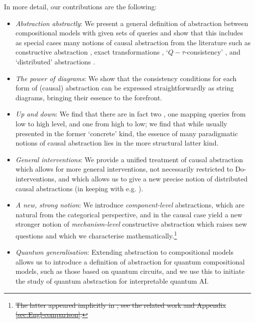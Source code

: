 \documentclass{article}
\begin{document}
\vspace*{0.15cm}
\begin{center}
\end{center}
\vspace*{0.15cm}
In more detail, our contributions are the following: 
\begin{itemize}


	\item \emph{Abstraction abstractly}:  
	We present a general definition of abstraction between compositional models with given sets of queries and show that this includes as special cases many notions of causal abstraction from the literature such as constructive abstraction \cite{BeckersEtAl_2019_AbstractingCausalModles}, exact transformations \cite{rubenstein2017causal}, `$Q-\tau$-consistency' \cite{xia2024neural}, and `distributed' abstractions \cite{geiger2023causal,geiger2024finding}. 

	\item  \emph{The power of diagrams}: We show that the consistency conditions for each form of (causal) abstraction can be expressed straightforwardly as string diagrams, bringing their essence to the forefront.

	\item  \emph{Up and down}: We find that there are in fact two , one mapping queries from low to high level, and one from high to low; we find that while usually presented in the former `concrete' kind, the essence of many paradigmatic notions of causal abstraction lies in the more structural latter kind. 

	\item \emph{General interventions}: We provide a unified treatment of causal abstraction which allows for more general interventions, not necessarily restricted to Do-interventions, and which allows us to give a new precise notion of distributed causal abstractions (in keeping with e.g. \cite{massidda2023causal, geiger2023causal}).

	\item \emph{A new, strong notion}: We introduce \emph{component-level} abstractions, which are natural from the categorical perspective, and in the causal case yield a new stronger notion of \emph{mechanism-level} constructive abstraction which raises new questions and which we characterise mathematically.\footnote{\st{The latter appeared implicitly in \cite{englberger2025causal}; see the related work and Appendix \ref{sec:Engl-comparison}.}}  

	\item \emph{Quantum generalisation}: Extending abstraction to compositional models allows us to introduce a  definition of abstraction for quantum compositional models, such as those based on quantum circuits, and we use this to initiate the study of quantum abstraction for interpretable quantum AI.   
  
\end{itemize}
\end{document}
